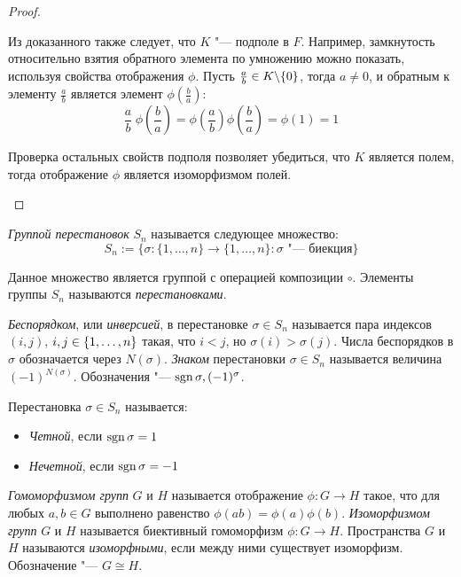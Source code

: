\begin{proof}
\begin{enumerate}
    		Из доказанного также следует, что $K$ "--- подполе в $F$. Например, замкнутость относительно взятия обратного элемента по умножению можно показать, используя свойства отображения $\phi$. Пусть $\frac ab \in K \backslash \{0\}$, тогда $a \ne 0$, и обратным к элементу $\frac ab$ является элемент $\phi(\frac ba)$:
    		\[\frac ab\hspace{3pt}\phi\left(\frac{b}{a}\right) = \phi\left(\frac{a}{b}\right)\phi\left(\frac{b}{a}\right) = \phi(1) = 1\]
    		
    		Проверка остальных свойств подполя позволяет убедиться, что $K$ является полем, тогда отображение $\phi$ является изоморфизмом полей.\qedhere
    	\end{enumerate}
    \end{proof}
    
    \begin{definition}
    	\textit{Группой перестановок} $S_n$ называется следующее множество:
    	\[S_n := \{\sigma: \{1,\dots, n\} \rightarrow \{1,\dots, n\}: \sigma \text{ "--- биекция}\}\]
    	
    	Данное множество является группой с операцией композиции $\circ$. Элементы группы $S_n$ называются \textit{перестановками}.
    \end{definition}
    
    \begin{definition}
    	\textit{Беспорядком}, или \textit{инверсией}, в перестановке $\sigma \in S_n$ называется пара индексов $(i, j)$, $i, j \in \{1, \dotsc, n\}$ такая, что $i < j$, но $\sigma(i) > \sigma(j)$. Числа беспорядков в $\sigma$ обозначается через $N(\sigma)$. \textit{Знаком} перестановки $\sigma \in S_n$ называется величина $(-1)^{N(\sigma)}$. Обозначения "--- $\operatorname{sgn}{\sigma}, (-1)^{\sigma}$.
    \end{definition}
    
    \begin{definition}
    	Перестановка $\sigma \in S_n$ называется:
    	\begin{itemize}
    		\item \textit{Четной}, если $\operatorname{sgn}{\sigma} = 1$
    		\item \textit{Нечетной}, если $\operatorname{sgn}{\sigma} = -1$
    	\end{itemize}
    \end{definition}
    
    \begin{definition}
    	\textit{Гомоморфизмом групп} $G$ и $H$ называется отображение $\phi : G \rightarrow H$ такое, что для любых $a,b \in G$ выполнено равенство $\phi(ab) = \phi(a)\phi(b)$. \textit{Изоморфизмом групп} $G$ и $H$ называется биективный гомоморфизм $\phi : G \rightarrow H$. Пространства $G$ и $H$ называются \textit{изоморфными}, если между ними существует изоморфизм. Обозначение "--- $G \cong H$.
    \end{definition}
    
